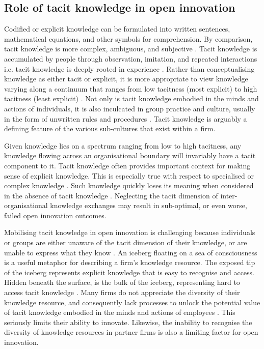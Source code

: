 \subsection{Role of tacit knowledge in open innovation}

Codified or explicit knowledge can be formulated into written sentences, mathematical equations, and other symbols for comprehension. By comparison, tacit knowledge is more complex, ambiguous, and subjective \citep{munoz2015tacit}. Tacit knowledge is accumulated by people through observation, imitation, and repeated interactions i.e. tacit knowledge is deeply rooted in experience \citep{nonaka1995knowledge}. Rather than conceptualising knowledge as either tacit or explicit, it is more appropriate to view knowledge varying along a continuum that ranges from low tacitness (most explicit) to high tacitness (least explicit) \citep{leonard1998role,chuang2016can}. Not only is tacit knowledge embodied in the minds and actions of individuals, it is also inculcated in group practice and culture, usually in the form of unwritten rules and procedures \citep{munoz2015tacit}. Tacit knowledge is arguably a defining feature of the various sub-cultures that exist within a firm. \medskip

Given knowledge lies on a spectrum ranging from low to high tacitness, any knowledge flowing across an organisational boundary will invariably have a tacit component to it. Tacit knowledge often provides important context for making sense of explicit knowledge. This is especially true with respect to specialised or complex knowledge \citep{leonard1998role,argote2000knowledge,szulanski2003sticky,amar2008descriptive}. Such knowledge quickly loses its meaning when considered in the absence of tacit knowledge \citep{amar2008descriptive,seidler2008use}. Neglecting the tacit dimension of inter\hyp{}organisational knowledge exchanges may result in sub-optimal, or even worse, failed open innovation outcomes. \medskip

Mobilising tacit knowledge in open innovation is challenging because individuals or groups are either unaware of the tacit dimension of their knowledge, or are unable to express what they know \citep{polanyi1966tacit,leonard1998role}. An iceberg floating on a sea of consciousness is a useful metaphor for describing a firm's knowledge resource. The exposed tip of the iceberg represents explicit knowledge that is easy to recognise and access. Hidden beneath the surface, is the bulk of the iceberg, representing hard to access tacit knowledge \citep{mcadam1999critical}. Many firms do not appreciate the diversity of their knowledge resource, and consequently lack processes to unlock the potential value of tacit knowledge embodied in the minds and actions of employees \citep{nonaka1994dynamic,horvath2000working}. This seriously limits their ability to innovate. Likewise, the inability to recognise the diversity of knowledge resources in partner firms is also a limiting factor for open innovation. \medskip

